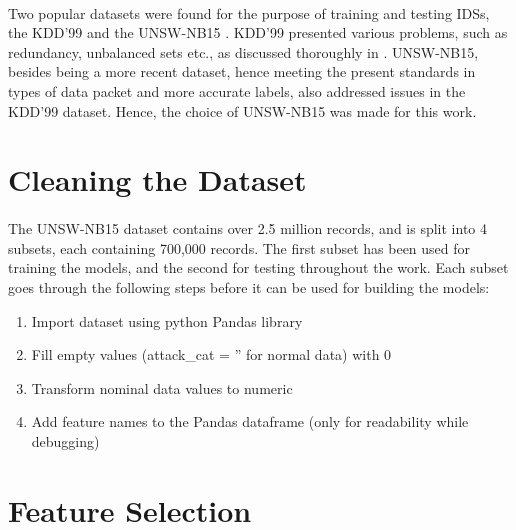 \paragraph{}
Two popular datasets were found for the purpose of training and testing IDSs, the KDD'99 \cite{kdd99} and the UNSW-NB15 \cite{unsw15}. KDD'99 presented various problems, such as redundancy, unbalanced sets etc., as discussed thoroughly in \cite{unsw_comparison}. UNSW-NB15, besides being a more recent dataset, hence meeting the present standards in types of data packet and more accurate labels, also addressed issues in the KDD'99 dataset. Hence, the choice of UNSW-NB15 was made for this work.

\section{Cleaning the Dataset}
\paragraph{}
The UNSW-NB15 dataset contains over 2.5 million records, and is split into 4 subsets, each containing 700,000 records. The first subset has been used for training the models, and the second for testing throughout the work. Each subset goes through the following steps before it can be used for building the models:
\begin{enumerate}
    \item Import dataset using python Pandas library
    \item Fill empty values (attack\_cat = '' for normal data) with 0
    \item Transform nominal data values to numeric
    \item Add feature names to the Pandas dataframe (only for readability while debugging)
\end{enumerate}

\section{Feature Selection}
\label{feature_select}
